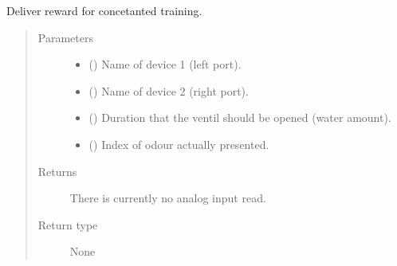 \documentclass[letterpaper,10pt,english]{sphinxmanual}
\begin{document}
\begin{fulllineitems}
\label{\detokenize{NoSeMazeControl/HelperFunctions:HelperFunctions.Reward.deliver_reward_static_concatenate}}
\pysigstartsignatures
{}
\pysigstopsignatures
\sphinxAtStartPar
Deliver reward for concetanted training.
\begin{quote}\begin{description}
\item[{Parameters}] \leavevmode\begin{itemize}
\item {} 
\sphinxAtStartPar
{} () \textendash{} Name of device 1 (left port).

\item {} 
\sphinxAtStartPar
{} () \textendash{} Name of device 2 (right port).

\item {} 
\sphinxAtStartPar
{} () \textendash{} Duration that the ventil should be opened (water amount).

\item {} 
\sphinxAtStartPar
{} () \textendash{} Index of odour actually presented.

\end{itemize}

\item[{Returns}] \leavevmode
\sphinxAtStartPar
{} \textendash{} There is currently no analog input read.

\item[{Return type}] \leavevmode
\sphinxAtStartPar
None

\end{description}\end{quote}

\end{fulllineitems}

\end{document}
